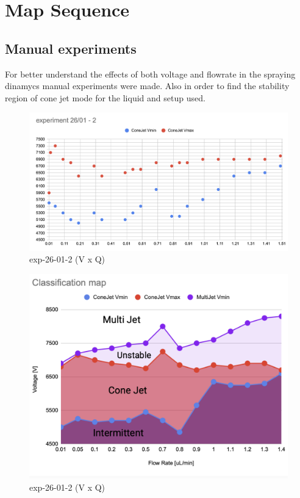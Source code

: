 \section{Map Sequence}
\label{sec:map_results}



\subsection{Manual experiments}


For better understand the effects of both voltage and flowrate in the spraying dinamycs manual experiments were made.
Also in order to find the stability region of cone jet mode for the liquid and setup used.



\begin{figure}[H]
    \center
    \includegraphics[width=12cm]{Figuras/report3/exp26-01-2.png}
    \caption{ exp-26-01-2 (V x Q)}
\end{figure}


\begin{figure}[H]
    \center
    \includegraphics[width=12cm]{Figuras/regions.png}
    \caption{ exp-26-01-2 (V x Q)}
\end{figure}


